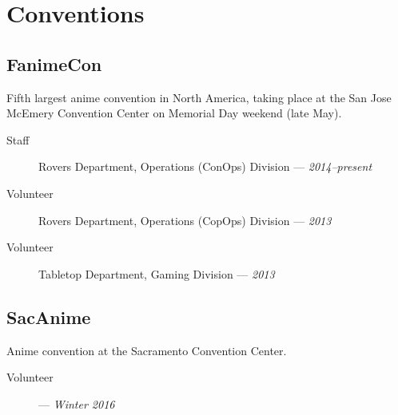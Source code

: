 \documentclass[10pt]{article}
\author{August Valera}
\begin{document}

\section*{Conventions}

\subsection*{FanimeCon}
Fifth largest anime convention in North America, taking place at the San Jose
McEmery Convention Center on Memorial Day weekend (late May).

\begin{description}
  \item[Staff] Rovers Department, Operations (ConOps) Division ---
    \textit{2014--present}
  \item[Volunteer] Rovers Department, Operations (CopOps) Division --- \textit{2013}
  \item[Volunteer] Tabletop Department, Gaming Division --- \textit{2013}
\end{description}

\subsection*{SacAnime}
Anime convention at the Sacramento Convention Center.

\begin{description}
  \item[Volunteer] --- \textit{Winter 2016}
\end{description}
\end{document}

